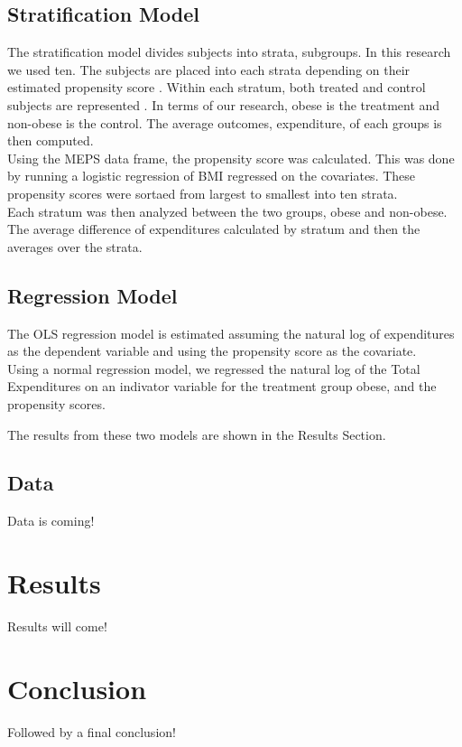 \documentclass[11pt,twocolumn]{article}
\begin{document}
\subsection{Stratification Model}
The stratification model divides subjects into strata, subgroups. In this research we used ten. The subjects are placed into each strata depending on their estimated propensity score \citep{austin2011introduction}. Within each stratum, both treated and control subjects are represented \citep{becker2002estimation}. In terms of our research, obese is the treatment and non-obese is the control. The average outcomes, expenditure, of each groups is then computed.\\
\indent Using the MEPS data frame, the propensity score was calculated. This was done by running a logistic regression of BMI regressed on the covariates. These propensity scores were sortaed from largest to smallest into ten strata.\\
\indent Each stratum was then analyzed between the two groups, obese and non-obese. The average difference of expenditures calculated by stratum and then the averages over the strata.
 
\subsection{Regression Model}
The OLS regression model is estimated assuming the natural log of expenditures as the dependent variable and using the propensity score as the covariate. \\
\indent Using a normal regression model, we regressed the natural log of the Total Expenditures on an indivator variable for the treatment group obese, and the propensity scores.\\
\begin{center}
The results from these two models are shown in the Results Section.
\end{center}
 
\subsection{Data}
Data is coming!
\section{Results}
Results will come!
\section{Conclusion}
Followed by a final conclusion!
\end{document}
